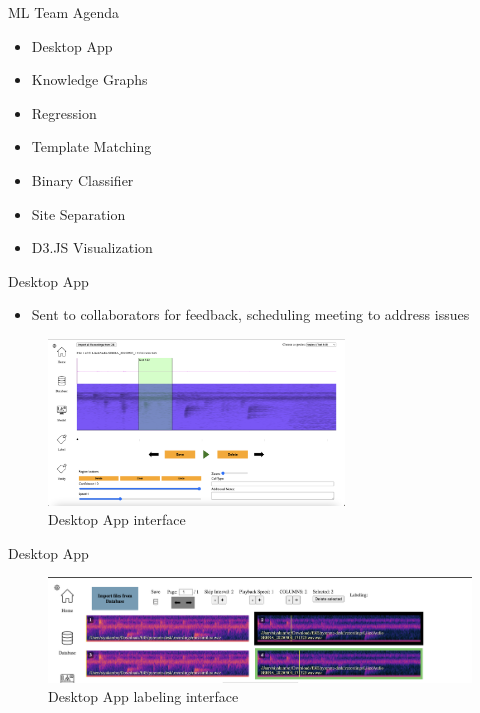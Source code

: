 \begin{frame}{ML Team Agenda}
    \begin{itemize}
        \item Desktop App
        \item Knowledge Graphs
        \item Regression
        \item Template Matching
        \item Binary Classifier
        \item Site Separation
        \item D3.JS Visualization
    \end{itemize}
\end{frame}

\begin{frame}{Desktop App}
    \begin{itemize}
        \item Sent to collaborators for feedback, scheduling meeting to address issues
    \end{itemize}
    \begin{figure}
        \centering
        \includegraphics[height=0.7\textheight,width=0.7\textwidth,keepaspectratio]{images/desktop_app_1.png}
        \caption{Desktop App interface}
    \end{figure}
\end{frame}

\begin{frame}{Desktop App}
    \begin{figure}
        \centering
        \includegraphics[height=1.0\textheight,width=1.0\textwidth,keepaspectratio]{images/desktop_app_2.png}
        \caption{Desktop App labeling interface}
    \end{figure}
\end{frame}

